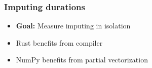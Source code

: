 \documentclass[t,english]{beamer}
\begin{document}
\begin{frame}
    \frametitle{Imputing durations}
        \begin{itemize}
        \item \textbf{Goal:} Measure imputing in isolation
        \end{itemize}
        \begin{itemize}
        \item<3-> Rust benefits from compiler
        \item<4->  NumPy benefits from partial vectorization
    \end{itemize}
\end{frame}
\end{document}
